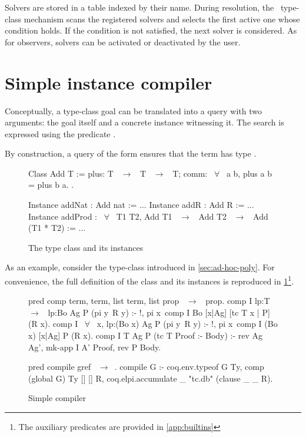 Solvers are stored in a table indexed by their name. During resolution,
the \rocq\ type-class mechanism scans the registered solvers and selects
the first active one whose condition holds. If the condition is not
satisfied, the next solver is considered. As for observers, solvers can
be activated or deactivated by the user.

\section{Simple instance compiler}
\label{sec:simple-instance-compiler}


Conceptually, a type-class goal can be translated into a query with two
arguments: the goal itself and a concrete instance witnessing it. The
search is expressed using the predicate .

By construction, a query of the form  ensures that the term
 has type .


\begin{figure}
  \begin{coqcode}
  Class Add T := {
    plus: T ~$\rightarrow$~ T ~$\rightarrow$~ T;
    comm: ~$\forall$~ a b, plus a b = plus b a.
  }.

  Instance addNat : Add nat := ...
  Instance addR : Add R  := ...
  Instance addProd : ~$\forall$~ T1 T2, Add T1 ~$\rightarrow$~ Add T2 ~$\rightarrow$~ Add (T1 * T2) := ...
  \end{coqcode}
  \caption{The  type class and its instances}
  \label{fig:add-class-full}
\end{figure}%

As an example, consider the  type-class introduced in
\cref{sec:ad-hoc-poly}. For convenience, the full definition of the class and
its instances is reproduced in \cref{fig:add-class-full}\footnote{The auxiliary
predicates are provided in \cref{app:builtins}}.

\begin{figure}
  \begin{elpicode}
  pred comp term, term, list term, list prop ~$\rightarrow$~ prop.
  comp I {{lp:T ~$\rightarrow$~ lp:Bo}} Ag P (pi y\ R y) :- !,  %
    pi x\ comp I Bo [x|Ag] [tc T x | P] (R x).
  comp I {{~$\forall$~ x, lp:(Bo x)}} Ag P (pi y\ R y) :- !, %
    pi x\ comp I (Bo x) [x|Ag] P (R x).
  comp I T Ag P (tc T Proof :- Body) :-   %
    rev Ag Ag',
    mk-app I A' Proof,
    rev P Body.

  pred compile gref ~$\rightarrow$~.
  compile G :- coq.env.typeof G Ty,
    comp (global G) Ty [] [] R,
    coq.elpi.accumulate _ "tc.db" (clause _ _ R).
  \end{elpicode}
  \caption{Simple \elpi compiler}
  \label{fig:simple-elpi-compiler-tc}
\end{figure}

